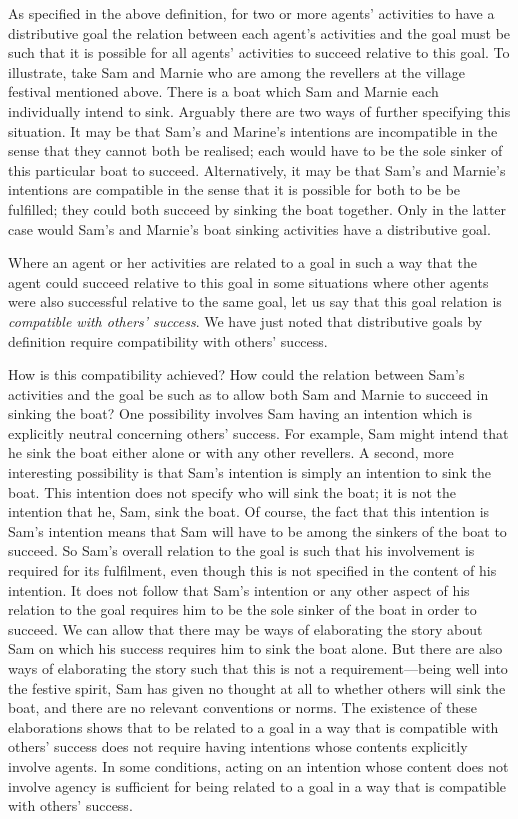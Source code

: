\documentclass[12pt,a4paper]{extarticle}
\begin{document}
As specified in the above definition, 
	for two or more agents' activities to have a distributive goal 
	the relation between each agent's activities and the goal must be such that it is possible for all agents' activities to succeed relative to this goal.
To illustrate, take Sam and Marnie who are among the revellers at the village festival mentioned above.  There is a boat which Sam and Marnie each individually intend to sink.  Arguably there are two ways of further specifying this situation.  It may be that Sam's and Marine's intentions are incompatible in the sense that they cannot both be realised; each would have to be the sole sinker of this particular boat to succeed.   Alternatively, it may be that Sam's and Marnie's intentions are compatible in the sense that it is possible for both to be be fulfilled; they could both succeed by sinking the boat together.  Only in the latter case would Sam's and Marnie's boat sinking activities have a distributive goal.

Where an agent or her activities are related to a goal in such a way that the agent could succeed relative to this goal in some situations where other agents were also successful relative to the same goal, let us say that this goal relation is \emph{compatible with others' success}.   
We have just noted that distributive goals by definition require compatibility with others' success.

How is this compatibility achieved?  How could the relation between Sam's activities and the goal be such as to allow both Sam and Marnie to succeed in sinking the boat?
One possibility involves Sam having an intention which is explicitly neutral concerning others' success.  
For example, Sam might intend that he sink the boat either alone or with any other revellers.
A second, more interesting possibility is that Sam's intention is simply an intention to sink the boat.
This intention does not specify who will sink the boat; it is not the intention that he, Sam, sink the boat.
Of course, the fact that this intention is Sam's intention means that Sam will have to be among the sinkers of the boat to succeed.  
So Sam's overall relation to the goal is such that his involvement is required for its fulfilment, even though this is not specified in the content of his intention.
It does not follow that Sam's intention or any other aspect of his relation to the goal requires him to be the sole sinker of the boat in order to succeed.
We can allow that there may be ways of elaborating the story about Sam on which his success requires him to sink the boat alone.  
But there are also ways of elaborating the story such that this is not a requirement---being well into the festive spirit, Sam has given no thought at all to whether others will sink the boat, and there are no relevant conventions or norms.
The existence of these elaborations shows that to be related to a goal in a way that is compatible with others' success does not require having intentions whose contents explicitly involve agents.
In some conditions, acting on an intention whose content does not  involve agency is sufficient for being related to a goal in a way that is compatible with others' success.
\end{document}
